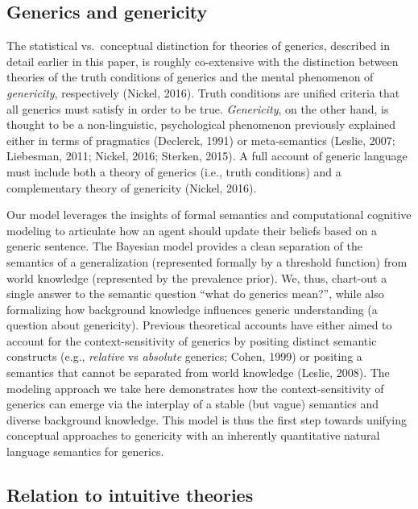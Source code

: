 \documentclass[english,,man,floatsintext]{apa6}
\theoremstyle{definition}
\theoremstyle{definition}
\theoremstyle{definition}
\theoremstyle{remark}
\begin{document}
\hypertarget{generics-and-genericity}{%
\subsection{Generics and genericity}\label{generics-and-genericity}}

The statistical vs.~conceptual distinction for theories of generics,
described in detail earlier in this paper, is roughly co-extensive with
the distinction between theories of the truth conditions of generics and
the mental phenomenon of \emph{genericity}, respectively (Nickel, 2016).
Truth conditions are unified criteria that all generics must satisfy in
order to be true. \emph{Genericity}, on the other hand, is thought to be
a non-linguistic, psychological phenomenon previously explained either
in terms of pragmatics (Declerck, 1991) or meta-semantics (Leslie, 2007;
Liebesman, 2011; Nickel, 2016; Sterken, 2015). A full account of generic
language must include both a theory of generics (i.e., truth conditions)
and a complementary theory of genericity (Nickel, 2016).

Our model leverages the insights of formal semantics and computational
cognitive modeling to articulate how an agent should update their
beliefs based on a generic sentence. The Bayesian model provides a clean
separation of the semantics of a generalization (represented formally by
a threshold function) from world knowledge (represented by the
prevalence prior). We, thus, chart-out a single answer to the semantic
question \enquote{what do generics mean?}, while also formalizing how
background knowledge influences generic understanding (a question about
genericity). Previous theoretical accounts have either aimed to account
for the context-sensitivity of generics by positing distinct semantic
constructs (e.g., \emph{relative} vs \emph{absolute} generics; Cohen,
1999) or positing a semantics that cannot be separated from world
knowledge (Leslie, 2008). The modeling approach we take here
demonstrates how the context-sensitivity of generics can emerge via the
interplay of a stable (but vague) semantics and diverse background
knowledge. This model is thus the first step towards unifying conceptual
approaches to genericity with an inherently quantitative natural
language semantics for generics.

\hypertarget{relation-to-intuitive-theories}{%
\subsection{Relation to intuitive
theories}\label{relation-to-intuitive-theories}}
\end{document}
